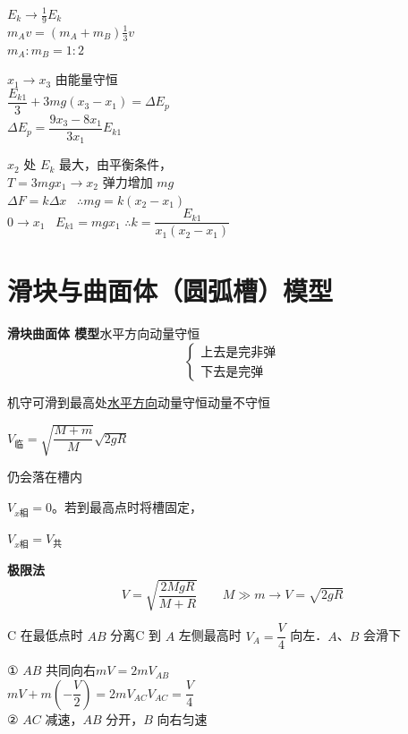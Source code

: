 $E_k\to\frac19 E_k$\\
$m_Av=(m_A+m_B)\frac13 v$\\
$m_A:m_B=1:2$

\unclear{$\because$} $x_1\to x_3$ 由能量守恒\\
$\dfrac{E_{k1}}{3}+3mg(x_3-x_1)=\Delta E_p$\\
$\Delta E_p=\dfrac{9x_3-8x_1}{3x_1}E_{k1}$

$x_2$ 处 $E_k$ 最大，由平衡条件，\\
\hspace*{1em}$T=3mg$\qquad $x_1\to x_2$ 弹力增加 $mg$\\
\hspace*{2em}$\Delta F=k\Delta x$ \ $\therefore mg=k(x_2-x_1)$\\
\hspace*{2em}$0\to x_1$ \ $E_{k1}=mgx_1$ \quad $\therefore k=\dfrac{E_{k1}}{x_1(x_2-x_1)}$


\section{滑块与曲面体（圆弧槽）模型}
\textbf{滑块曲面体 模型}\quad 水平方向动量守恒
\[ \left\{\begin{array}{l}\text{上去是完非弹}\\[2pt] \text{下去是完弹}\end{array}\right. \]

机守可滑到最高处\quad \underline{水平方向}动量守恒\quad 动量不守恒

$V_{\text{临}}=\sqrt{\dfrac{M+m}{M}}\sqrt{2gR}$ %

仍会落在槽内

$V_{x\text{相}}=0$。若到最高点时将槽固定，

$V_{x\text{相}}=V_{\text{共}}$

\textbf{极限法}
\[
V=\sqrt{\frac{2MgR}{M+R}}\qquad M\gg m\to V=\sqrt{2gR}
\] %

\begin{problem}
C 在最低点时 $AB$ 分离\quad C 到 $A$ 左侧最高时 $V_A=\dfrac V4$ 向左．$A$、$B$ 会滑下
\begin{solution}
① $AB$ 共同向右\quad $mV=2mV_{AB}$\\
$mV+m\left(-\dfrac V2\right)=2mV_{AC}$\qquad $V_{AC}=\dfrac V4$\\
② $AC$ 减速，$AB$ 分开，$B$ 向右匀速
\end{solution}
\end{problem}

